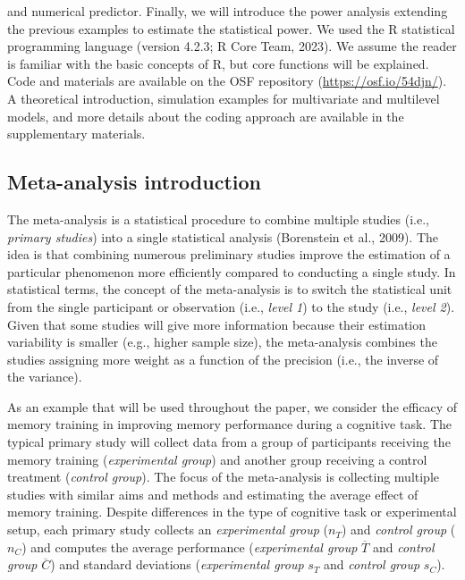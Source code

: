 \documentclass[
  man,floatsintext]{apa6}
\begin{document}
and numerical predictor. Finally, we will introduce the power analysis extending the previous examples to estimate the statistical power. We used the R statistical programming language (version 4.2.3; R Core Team, 2023). We assume the reader is familiar with the basic concepts of R, but core functions will be explained. Code and materials are available on the OSF repository (\url{https://osf.io/54djn/}). \color{red} A theoretical introduction, simulation examples for multivariate and multilevel models, and more details about the coding approach are available in the supplementary materials. \color{black}

\hypertarget{meta-analysis-introduction}{%
\subsection{Meta-analysis introduction}\label{meta-analysis-introduction}}

The meta-analysis is a statistical procedure to combine multiple studies (i.e., \emph{primary studies}) into a single statistical analysis (Borenstein et al., 2009). The idea is that combining numerous preliminary studies improve the estimation of a particular phenomenon more efficiently compared to conducting a single study. In statistical terms, the concept of the meta-analysis is to switch the statistical unit from the single participant or observation (i.e., \emph{level 1}) to the study (i.e., \emph{level 2}). Given that some studies will give more information because their estimation variability is smaller (e.g., higher sample size), the meta-analysis combines the studies assigning more weight as a function of the precision (i.e., the inverse of the variance).

\color{red} As an example that will be used throughout the paper, we consider the efficacy of memory training in improving memory performance during a cognitive task. The typical primary study will collect data from a group of participants receiving the memory training (\emph{experimental group}) and another group receiving a control treatment (\emph{control group}). The focus of the meta-analysis is collecting multiple studies with similar aims and methods and estimating the average effect of memory training. Despite differences in the type of cognitive task or experimental setup, each primary study collects an \emph{experimental group} (\(n_{T}\)) and \emph{control group} (\(n_{C}\)) and computes the average performance (\emph{experimental group} \(\overline T\) and \emph{control group} \(\overline C\)) and standard deviations (\emph{experimental group} \(s_{T}\) and \emph{control group}
\(s_{C}\)). \color{black}
\end{document}
